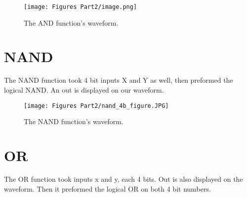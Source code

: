 \documentclass[
	letterpaper, %
	10pt, %
]{CSUniSchoolLabReport}
\begin{document}
\begin{figure}[H] %
	\texttt{[image: Figures Part2/image.png]} %
	\caption{The AND function's waveform.}
\end{figure}

\section{NAND}
The NAND function took 4 bit inputs X and Y as well, then preformed the logical NAND. An out is displayed on our waveform.

\begin{figure}[H] %
	\texttt{[image: Figures Part2/nand\_4b\_figure.JPG]} %
	\caption{The NAND function's waveform.}
\end{figure}


\section{OR}
The OR function took inputs x and y, each 4 bits. Out is also displayed on the waveform. Then it preformed the logical OR on both 4 bit numbers.
\end{document}
